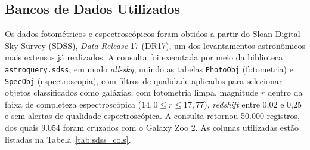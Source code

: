 \documentclass[12pt, a4paper]{article}
\begin{document}
\subsection{Bancos de Dados Utilizados}

Os dados fotométricos e espectroscópicos foram obtidos a partir do Sloan
Digital Sky Survey (SDSS), \textit{Data Release} 17 (DR17), um dos
levantamentos astronômicos mais extensos já realizados. A consulta foi
executada por meio da biblioteca \texttt{astroquery.sdss}, em modo
\textit{all-sky}, unindo as tabelas \texttt{PhotoObj} (fotometria) e
\texttt{SpecObj} (espectroscopia), com filtros de qualidade aplicados para
selecionar objetos classificados como galáxias, com fotometria limpa,
magnitude $r$ dentro da faixa de completeza espectroscópica
($14{,}0 \leq r \leq 17{,}77$), \textit{redshift} entre 0,02 e 0,25 e sem
alertas de qualidade espectroscópica. A consulta retornou 50.000 registros,
dos quais 9.054 foram cruzados com o Galaxy Zoo 2. As colunas utilizadas
estão listadas na Tabela~\ref{tab:sdss_cols}.
\end{document}
